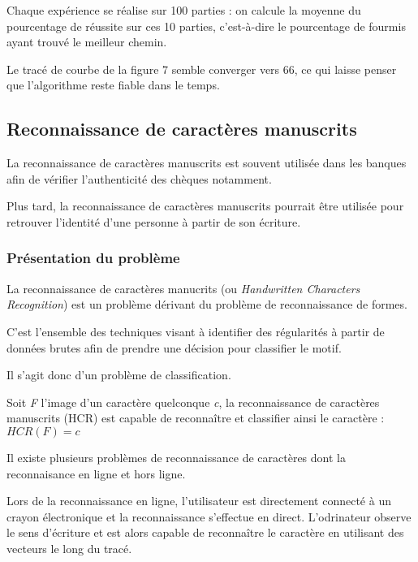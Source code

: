 \documentclass[
12pt,
french,
]{article}
\begin{document}
Chaque expérience se réalise sur 100 parties : on calcule la moyenne du
pourcentage de réussite sur ces 10 parties, c'est-à-dire le pourcentage
de fourmis ayant trouvé le meilleur chemin.

Le tracé de courbe de la figure 7 semble converger vers 66, ce qui
laisse penser que l'algorithme reste fiable dans le temps.

\hypertarget{reconnaissance-de-caractuxe8res-manuscrits}{%
\subsection{Reconnaissance de caractères
manuscrits}\label{reconnaissance-de-caractuxe8res-manuscrits}}

La reconnaissance de caractères manuscrits est souvent utilisée dans les
banques afin de vérifier l'authenticité des chèques notamment.

Plus tard, la reconnaissance de caractères manuscrits pourrait être
utilisée pour retrouver l'identité d'une personne à partir de son
écriture.

\hypertarget{pruxe9sentation-du-probluxe8me}{%
\subsubsection{Présentation du
problème}\label{pruxe9sentation-du-probluxe8me}}

La reconnaissance de caractères manucrits (ou \emph{Handwritten
Characters Recognition}) est un problème dérivant du problème de
reconnaissance de formes.

C'est l'ensemble des techniques visant à identifier des régularités à
partir de données brutes afin de prendre une décision pour classifier le
motif.

Il s'agit donc d'un problème de classification.

Soit \emph{F} l'image d'un caractère quelconque \emph{c}, la
reconnaissance de caractères manuscrits (HCR) est capable de reconnaître
et classifier ainsi le caractère : \(HCR(F) = c\)

Il existe plusieurs problèmes de reconnaissance de caractères dont la
reconnaisance en ligne et hors ligne.

Lors de la reconnaissance en ligne, l'utilisateur est directement
connecté à un crayon électronique et la reconnaissance s'effectue en
direct. L'odrinateur observe le sens d'écriture et est alors capable de
reconnaître le caractère en utilisant des vecteurs le long du tracé.
\end{document}
